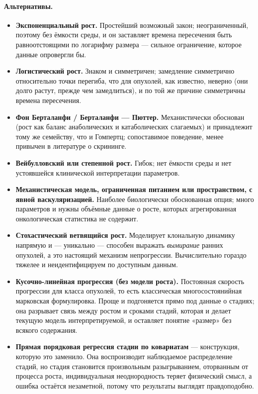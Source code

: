 \documentclass[12pt,a4paper]{article}
\newcommand{\alt}[1]{\paragraph{Альтернативы.} #1}
\begin{document}
\alt{\begin{itemize}[nosep]
  \item \textbf{Экспоненциальный рост.} Простейший возможный закон; неограниченный, поэтому без ёмкости
        среды, и он заставляет времена пересечения быть равноотстоящими по логарифму размера --- сильное
        ограничение, которое данные опровергли бы.
  \item \textbf{Логистический рост.} Знаком и симметричен; замедление симметрично относительно точки
        перегиба, что для опухолей, как известно, неверно (они долго растут, прежде чем замедлиться), и по
        той же причине симметричны времена пересечения.
  \item \textbf{Фон Берталанфи / Берталанфи --- Пюттер.} Механистически обоснован (рост как баланс
        анаболических и катаболических слагаемых) и принадлежит тому же семейству, что и Гомпертц;
        сопоставимое поведение, менее привычен в литературе о скрининге.
  \item \textbf{Вейбулловский или степенной рост.} Гибок; нет ёмкости среды и нет устоявшейся клинической
        интерпретации параметров.
  \item \textbf{Механистическая модель, ограниченная питанием или пространством, с явной васкуляризацией.}
        Наиболее биологически обоснованная опция; много параметров и нужны объёмные данные о росте, которых
        агрегированная онкологическая статистика не содержит.
  \item \textbf{Стохастический ветвящийся рост.} Моделирует клональную динамику напрямую и --- уникально ---
        способен выражать \emph{вымирание} ранних опухолей, а это настоящий механизм непрогрессии.
        Вычислительно гораздо тяжелее и неидентифицируем по доступным данным.
  \item \textbf{Кусочно-линейная прогрессия (без модели роста).} Постоянная скорость прогрессии для класса
        опухолей, то есть классическая многосостоянийная марковская формулировка. Проще и подгоняется прямо
        под данные о стадиях; она разрывает связь между ростом и сроками стадий, которая и делает текущую
        модель интерпретируемой, и оставляет понятие «размер» без всякого содержания.
  \item \textbf{Прямая порядковая регрессия стадии по ковариатам} --- конструкция, которую это заменило. Она
        воспроизводит наблюдаемое распределение стадий, но стадия становится произвольным разыгрыванием,
        оторванным от процесса роста, индивидуальная неоднородность теряет физический смысл, а ошибка
        остаётся незаметной, потому что результаты выглядят правдоподобно.
\end{itemize}}
\end{document}
